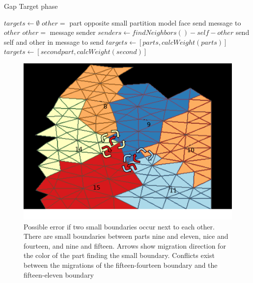 \documentclass{thesis}
\let\ForEach\ForAll
\begin{document}
\begin{algorithm}
\caption{Gap Target phase}
\label{alg:targets}
\begin{algorithmic}[1]
  \State $targets \leftarrow \emptyset$
    \State $other = $ part opposite small partition model face
    \State send message to $other$
  \EndIf
    \State $other = $ message sender
    \State $senders \leftarrow findNeighbors() - self - other$
  \EndIf
  \ForEach {$send \in senders$}
    \State send self and other in message to send
  \EndFor
    \State $targets \leftarrow [parts,calcWeight(parts)]$
    \State $targets \leftarrow [secondpart,calcWeight(second)]$
  \EndIf
\EndProcedure
\end{algorithmic}
\end{algorithm}


\begin{figure} [hb]
\centering
\captionsetup{justification=centering,margin=1cm}
\includegraphics[width=.6\textwidth]{MIS_problem.png}
\caption{\label{fig:recvsend} \textnormal{Possible error if two small boundaries occur next to each other. There are small boundaries between parts nine and eleven, nice and fourteen, and nine and fifteen. Arrows show migration direction for the color of the part finding the small boundary. Conflicts exist between the migrations of the fifteen-fourteen boundary and the fifteen-eleven boundary}}
\end{figure}
\end{document}
